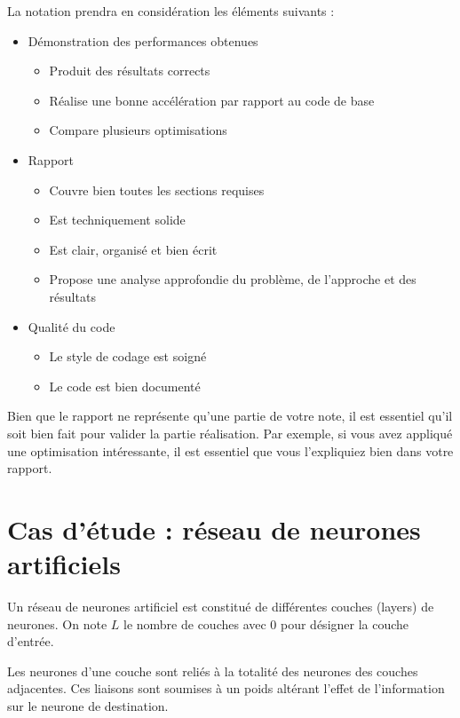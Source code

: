 \documentclass[11pt]{paper}
\begin{document}
La notation prendra en considération les éléments suivants :
\begin{itemize}
	\item Démonstration des performances obtenues
	\begin{itemize}
		\item Produit des résultats corrects
		\item Réalise une bonne accélération par rapport au code de base
		\item Compare plusieurs optimisations
	\end{itemize}

	\item Rapport
	\begin{itemize}
		\item Couvre bien toutes les sections requises 
		\item Est techniquement solide
		\item Est clair, organisé et bien écrit
		\item Propose une analyse approfondie du problème, de l'approche et des résultats
	\end{itemize}
	
	\item Qualité du code
	\begin{itemize}
		\item Le  style de codage est soigné
		\item Le code est bien documenté 
	\end{itemize}
\end{itemize}

Bien que le rapport ne représente qu'une partie de votre note, il est essentiel qu'il soit bien fait pour valider la partie réalisation. Par exemple, si vous avez appliqué une optimisation intéressante, il est essentiel que vous l'expliquiez bien dans votre rapport.


  \section{Cas d'étude : réseau de neurones artificiels}

Un réseau de neurones artificiel est constitué de différentes couches (layers) de neurones. On note $L$ le nombre de couches avec 0 pour désigner la couche d'entrée.

Les neurones d'une couche sont reliés à la totalité des neurones des couches adjacentes. Ces liaisons sont soumises à un poids altérant l'effet de l'information sur le neurone de destination.
\end{document}
